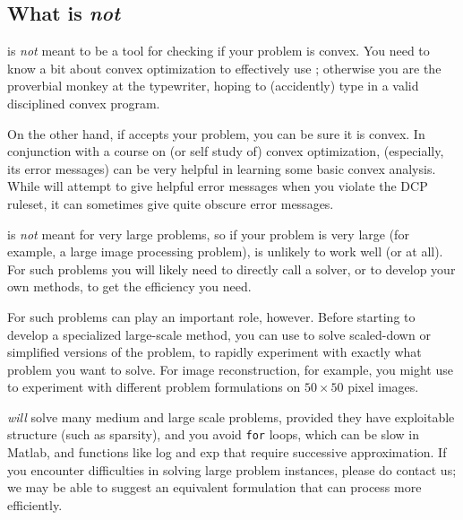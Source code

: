\documentclass[12pt]{article}
\begin{document}
\subsection{What \cvx is \emph{not}}

\cvx is \emph{not} meant to be a tool for checking if your problem
is convex.  
You need to know a bit about 
convex optimization to effectively use \cvx; otherwise you are the proverbial
monkey at the typewriter, hoping to (accidently) type in a valid disciplined
convex program.

On the other hand, if \cvx accepts your problem, you can be sure
it is convex.
In conjunction with a course on (or self study of) convex optimization,
\cvx (especially, its error messages) can be very helpful in learning
some basic convex analysis.
While \cvx will attempt to give helpful error messages when
you violate the DCP ruleset, it can sometimes give quite obscure error
messages.  

\cvx is \emph{not} meant
for very large problems, so if your problem is very large
(for example, a large image processing problem), \cvx is unlikely to
work well (or at all).
For such problems you will likely need to directly call a solver,
or to develop your own methods, to get the efficiency you need.

For such problems \cvx can play an important role, however.  Before
starting to develop a specialized large-scale method, you can use \cvx
to solve scaled-down or simplified versions of the problem, to rapidly
experiment with exactly what problem you want to solve.
For image reconstruction, for example, you might use \cvx to experiment
with different problem formulations on $50 \times 50$ pixel images.

\cvx \emph{will}
solve many medium and large scale problems, provided they
have exploitable structure (such as sparsity), and you 
avoid \verb+for+ loops, which can be slow in Matlab, and functions
like log and exp that require successive approximation.
If you encounter difficulties in solving large problem instances,
please do contact us; we may be able to suggest
an equivalent formulation that \cvx can process more efficiently.

\end{document}
